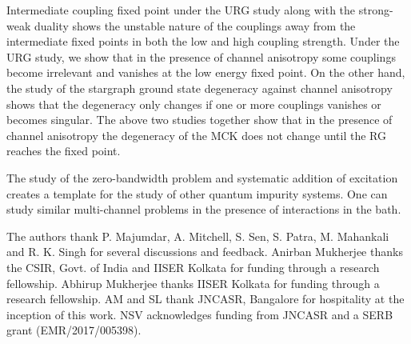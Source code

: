 \documentclass[reprint,prb,superscriptaddress]{revtex4-2}
\begin{document}
\par Intermediate coupling fixed point under the URG study along with the strong-weak duality shows the unstable nature of the couplings away from the intermediate fixed points in both the low and high coupling strength. Under the URG study, we show that in the presence of channel anisotropy some couplings become irrelevant and vanishes at the low energy fixed point. On the other hand, the study of the stargraph ground state degeneracy against channel anisotropy shows that the degeneracy only changes if one or more couplings vanishes or becomes singular. The above two studies together show that in the presence of channel anisotropy the degeneracy of the MCK does not change until the RG reaches the fixed point.

\par The study of the zero-bandwidth problem and systematic addition of excitation creates a template for the study of other quantum impurity systems. One can study similar multi-channel problems in the presence of interactions in the bath. 



\acknowledgments
The authors thank P. Majumdar, A. Mitchell, S. Sen, S. Patra, M. Mahankali and R. K. Singh for several discussions and feedback. Anirban Mukherjee thanks the CSIR, Govt. of India and IISER Kolkata for funding through a research fellowship. Abhirup Mukherjee thanks IISER Kolkata for funding through a research fellowship. AM and SL thank JNCASR, Bangalore for hospitality at the inception of this work. NSV acknowledges funding from JNCASR and a SERB grant (EMR/2017/005398).


\end{document}
